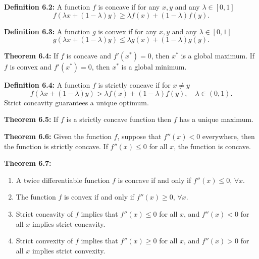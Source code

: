 \begin{original}
\textbf{Definition 6.2:} A function $f$ is concave if for any $x, y$ and any $\lambda \in [0,1]$
\[
f(\lambda x + (1 - \lambda)y) \ge \lambda f(x) + (1 - \lambda) f(y).
\]

\textbf{Definition 6.3:} A function $g$ is convex if for any $x, y$ and any $\lambda \in [0,1]$
\[
g(\lambda x + (1 - \lambda)y) \le \lambda g(x) + (1 - \lambda) g(y).
\]

\textbf{Theorem 6.4:} If $f$ is concave and $f'(x^*) = 0$, then $x^*$ is a global maximum. If $f$ is convex and $f'(x^*) = 0$, then $x^*$ is a global minimum.

\textbf{Definition 6.4:} A function $f$ is strictly concave if for $x \neq y$
\[
f(\lambda x + (1 - \lambda)y) > \lambda f(x) + (1 - \lambda) f(y), \quad \lambda \in (0,1).
\]
Strict concavity guarantees a unique optimum.

\textbf{Theorem 6.5:} If $f$ is a strictly concave function then $f$ has a unique maximum.

\textbf{Theorem 6.6:} Given the function $f$, suppose that $f''(x) < 0$ everywhere, then the function is strictly concave. If $f''(x) \le 0$ for all $x$, the function is concave.

\textbf{Theorem 6.7:}
\begin{enumerate}
\item A twice differentiable function $f$ is concave if and only if $f''(x) \le 0$, $\forall x$.
\item The function $f$ is convex if and only if $f''(x) \ge 0$, $\forall x$.
\item Strict concavity of $f$ implies that $f''(x) \le 0$ for all $x$, and $f''(x) < 0$ for all $x$ implies strict concavity.
\item Strict convexity of $f$ implies that $f''(x) \ge 0$ for all $x$, and $f''(x) > 0$ for all $x$ implies strict convexity.
\end{enumerate}
\end{original}
